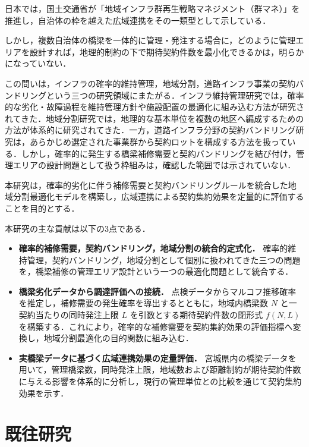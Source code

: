 \documentclass[Journal,letterpaper,InsideFigs,NoLineNumbers]{ascelike-new}
\begin{document}
日本では，国土交通省が「地域インフラ群再生戦略マネジメント（群マネ）」を推進し，自治体の枠を越えた広域連携をその一類型として示している\cite{mlit2025gunmane}．

しかし，複数自治体の橋梁を一体的に管理・発注する場合に，どのように管理エリアを設計すれば，地理的制約の下で期待契約件数を最小化できるかは，明らかになっていない．

この問いは，インフラの確率的維持管理，地域分割，道路インフラ事業の契約バンドリングという三つの研究領域にまたがる．インフラ維持管理研究では，確率的な劣化・故障過程を維持管理方針や施設配置の最適化に組み込む方法が研究されてきた\cite{nakazato2023,mizutani2025}．地域分割研究では，地理的な基本単位を複数の地区へ編成するための方法が体系的に研究されてきた\cite{kalcsics2019}．一方，道路インフラ分野の契約バンドリング研究は，あらかじめ選定された事業群から契約ロットを構成する方法を扱っている\cite{qiao2026}．しかし，確率的に発生する橋梁補修需要と契約バンドリングを結び付け，管理エリアの設計問題として扱う枠組みは，確認した範囲では示されていない．

本研究は，確率的劣化に伴う補修需要と契約バンドリングルールを統合した地域分割最適化モデルを構築し，広域連携による契約集約効果を定量的に評価することを目的とする．

本研究の主な貢献は以下の3点である．

\begin{itemize}
\item \textbf{確率的補修需要，契約バンドリング，地域分割の統合的定式化．} 確率的維持管理，契約バンドリング，地域分割として個別に扱われてきた三つの問題を，橋梁補修の管理エリア設計という一つの最適化問題として統合する．
\item \textbf{橋梁劣化データから調達評価への接続．} 点検データからマルコフ推移確率を推定し，補修需要の発生確率を導出するとともに，地域内橋梁数 $N$ と一契約当たりの同時発注上限 $L$ を引数とする期待契約件数の閉形式 $f(N,L)$ を構築する．これにより，確率的な補修需要を契約集約効果の評価指標へ変換し，地域分割最適化の目的関数に組み込む．
\item \textbf{実橋梁データに基づく広域連携効果の定量評価．} 宮城県内の橋梁データを用いて，管理橋梁数，同時発注上限，地域数および距離制約が期待契約件数に与える影響を体系的に分析し，現行の管理単位との比較を通じて契約集約効果を示す．
\end{itemize}

\section{既往研究}
\end{document}
